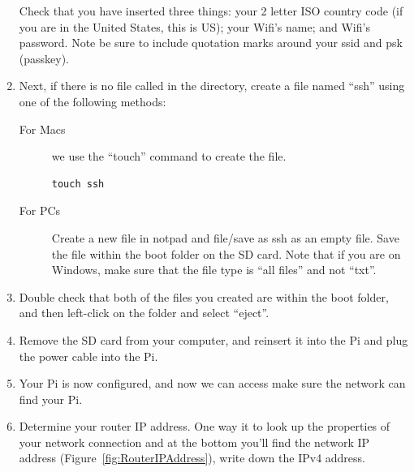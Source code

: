 \documentclass{article}\usepackage[]{graphicx}\usepackage[]{color}
\begin{document}
\begin{enumerate}
Check that you have inserted three things: your 2 letter ISO country code (if you are in the United States, this is US); your Wifi's name; and Wifi's password.  Note be sure to include quotation marks around your ssid and psk (passkey).

\item Next, if there is no file called in the directory, create a file named ``ssh'' using one of the following methods:

\begin{description}
  \item[For Macs] we use the ``touch'' command to create the file.
  
\begin{lstlisting}
touch ssh
\end{lstlisting}

\item[For PCs] Create a new file in notpad and file/save as ssh as an empty file.  Save the file within the boot folder on the SD card.  Note that if you are on Windows, make sure that the file type is ``all files'' and not ``txt''.

\end{description}

\item Double check that both of the files you created are within the boot folder, and then left-click on the folder and select ``eject''.  
\item Remove the SD card from your computer, and reinsert it into the Pi and plug the power cable into the Pi.

\item Your Pi is now configured, and now we can access make sure the network can find your Pi.

\item Determine your router IP address. One way it to look up the properties of your network connection and at the bottom you'll find the network IP address (Figure~\ref{fig:RouterIPAddress}), write down the IPv4 address. 


\end{enumerate}
\end{document}

